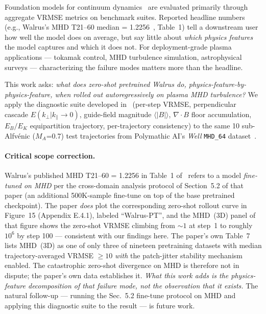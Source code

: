 \documentclass{article}
\begin{document}
Foundation models for continuum dynamics~\cite{mccabe2025walrus,herde2024poseidon,mccabe2024multiple} are evaluated primarily through aggregate VRMSE metrics on benchmark suites. Reported headline numbers (e.g., Walrus's MHD T21--60 median = 1.2256~\cite{mccabe2025walrus}, Table~1) tell a downstream user how well the model does on average, but say little about \emph{which physics features} the model captures and which it does not. For deployment-grade plasma applications --- tokamak control, MHD turbulence simulation, astrophysical surveys --- characterizing the failure modes matters more than the headline.

This work asks: \emph{what does zero-shot pretrained Walrus do, physics-feature-by-physics-feature, when rolled out autoregressively on plasma MHD turbulence?} We apply the diagnostic suite developed in~\cite{delaurentiis2026paper1} (per-step VRMSE, perpendicular cascade $E(k_\perp | k_\parallel \to 0)$, guide-field magnitude $\langle |B| \rangle$, $\nabla\cdot B$ floor accumulation, $E_B/E_K$ equipartition trajectory, per-trajectory consistency) to the same 10 sub-Alfv\'enic ($M_A$=0.7) test trajectories from Polymathic AI's \emph{Well} \texttt{MHD\_64} dataset~\cite{ohana2024well}.

\medskip
\paragraph{Critical scope correction.} Walrus's published MHD T21--60 = 1.2256 in Table~1 of~\cite{mccabe2025walrus} refers to a model \emph{fine-tuned on MHD} per the cross-domain analysis protocol of Section~5.2 of that paper (an additional 500K-sample fine-tune on top of the base pretrained checkpoint). The paper \emph{does} plot the corresponding zero-shot rollout curve in Figure~15 (Appendix E.4.1), labeled ``Walrus-PT'', and the MHD~(3D) panel of that figure shows the zero-shot VRMSE climbing from $\sim 1$ at step~1 to roughly $10^6$ by step 100 --- consistent with our findings here. The paper's own Table~7 lists MHD~(3D) as one of only three of nineteen pretraining datasets with median trajectory-averaged VRMSE $\geq 10$ \emph{with} the patch-jitter stability mechanism enabled. The catastrophic zero-shot divergence on MHD is therefore not in dispute; the paper's own data establishes it. \emph{What this work adds is the physics-feature decomposition of that failure mode, not the observation that it exists.} The natural follow-up --- running the Sec.~5.2 fine-tune protocol on MHD and applying this diagnostic suite to the result --- is future work.
\end{document}
